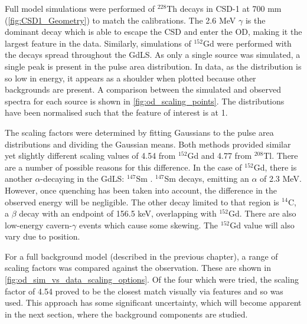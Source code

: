 \par
Full model simulations were performed of ${}^{228}$Th decays in CSD-1 at 700 mm (\autoref{fig:CSD1_Geometry}) to match the calibrations.
The 2.6 MeV $\gamma$ is the dominant decay which is able to escape the CSD and enter the OD, making it the largest feature in the data.
Similarly, simulations of ${}^{152}$Gd were performed with the decays spread throughout the GdLS.
As only a single source was simulated, a single peak is present in the pulse area distribution.
In data, as the distribution is so low in energy, it appears as a shoulder when plotted because other backgrounds are present.
A comparison between the simulated and observed spectra for each source is shown in \autoref{fig:od_scaling_points}.
The distributions have been normalised such that the feature of interest is at 1.

\par
The scaling factors were determined by fitting Gaussians to the pulse area distributions and dividing the Gaussian means.
Both methods provided similar yet slightly different scaling values of 4.54 from ${}^{152}$Gd and 4.77 from ${}^{208}$Tl.
There are a number of possible reasons for this difference.
In the case of ${}^{152}$Gd, there is another $\alpha$-decaying in the GdLS: ${}^{147}$Sm \cite{scotthaselschwardt_thesis_ref}.
${}^{147}$Sm decays, emitting an $\alpha$ of 2.3 MeV. 
However, once quenching has been taken into account, the difference in the observed energy will be negligible.
The other decay limited to that region is ${}^{14}$C, a $\beta$ decay with an endpoint of 156.5 keV, overlapping with ${}^{152}$Gd.
There are also low-energy cavern-$\gamma$ events which cause some skewing.
The ${}^{152}$Gd value will also vary due to position.

\par
For a full background model (described in the previous chapter), a range of scaling factors was compared against the observation.
These are shown in \autoref{fig:od_sim_vs_data_scaling_options}.
Of the four which were tried, the scaling factor of 4.54 proved to be the closest match visually via features and so was used.
This approach has some significant uncertainty, which will become apparent in the next section, where the background components are studied.






